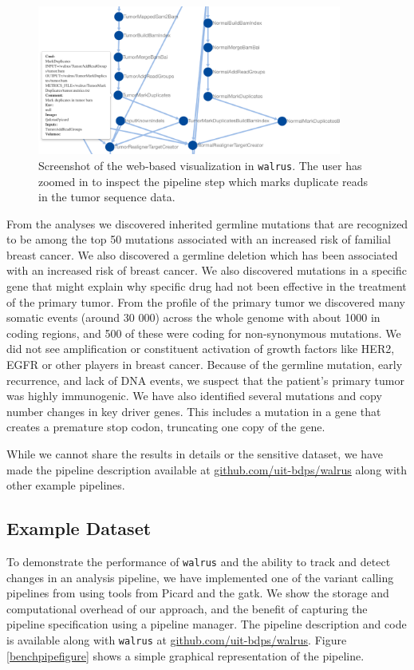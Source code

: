 \begin{figure}
    \centering
\includegraphics[width=10cm]{figures/webshot.png}
    \caption[Screenshot of the web-based visualization in
    \texttt{walrus}]{Screenshot of the web-based visualization in
    \texttt{walrus}. The user has zoomed in to inspect the pipeline step which
    marks duplicate reads in the tumor sequence data.}
    \label{webshotfig}
\end{figure} 

From the analyses we discovered inherited germline mutations that are recognized
to be among the top 50 mutations associated with an increased risk of familial
breast cancer. We also discovered a germline deletion which has been associated
with an increased risk of breast cancer. We also discovered mutations in a
specific gene that might explain why specific drug had not been effective in the
treatment of the primary tumor. From the profile of the primary tumor we
discovered many somatic events (around 30 000) across the whole genome with
about 1000 in coding regions, and 500 of these were coding for non-synonymous
mutations.  We did not see amplification or constituent activation of growth
factors like HER2, EGFR or other players in breast cancer. Because of the
germline mutation, early recurrence, and lack of DNA events, we suspect that the
patient's primary tumor was highly immunogenic. We have also identified several
mutations and copy number changes in key driver genes. This includes a mutation
in a gene that creates a premature stop codon, truncating one copy of the gene.

While we cannot share the results in details or the sensitive dataset, we have
made the pipeline description available at \url{github.com/uit-bdps/walrus}
along with other example pipelines. 

\subsection{Example Dataset}
To demonstrate the performance of \texttt{walrus} and the ability to track and
detect changes in an analysis pipeline, we have implemented one of the variant
calling pipelines from \cite{cornish2015comparison} using tools from Picard and
the \gls{gatk}. We show the storage and computational overhead of our approach,
and the benefit of capturing the pipeline specification using a pipeline
manager.  The pipeline description and code is available along with
\texttt{walrus} at \url{github.com/uit-bdps/walrus}. Figure
\ref{benchpipefigure} shows a simple graphical representation of the pipeline. 

